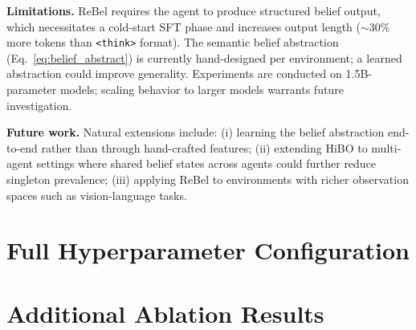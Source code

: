\documentclass{article}
\begin{document}
\textbf{Limitations.}
ReBel requires the agent to produce structured belief output, which necessitates
a cold-start SFT phase and increases output length ($\sim$30\% more tokens
than \texttt{<think>} format).
The semantic belief abstraction (Eq.~\ref{eq:belief_abstract}) is currently
hand-designed per environment; a learned abstraction could improve generality.
Experiments are conducted on 1.5B-parameter models; scaling behavior to larger
models warrants future investigation.

\textbf{Future work.}
Natural extensions include: (i) learning the belief abstraction end-to-end
rather than through hand-crafted features; (ii) extending HiBO to multi-agent
settings where shared belief states across agents could further reduce singleton
prevalence; (iii) applying ReBel to environments with richer observation spaces
such as vision-language tasks.






\appendix

\section{Full Hyperparameter Configuration}
\label{app:config}



\section{Additional Ablation Results}
\label{app:ablation}


\end{document}
